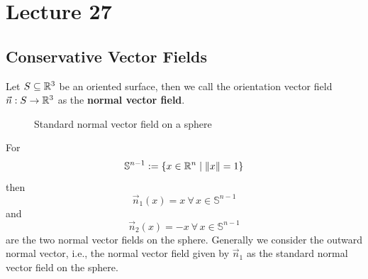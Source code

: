 \documentclass[../Analysis-3.tex]{subfiles}
\begin{document}
\chapter*{Lecture 27} %
\setcounter{chapter}{27} %
\setcounter{section}{0}

\section{Conservative Vector Fields}

Let $S \subseteq \mathbb{R}^3$ be an oriented surface, then we call the orientation vector field $\vec{n} : S \to \mathbb{R}^3$ as the \textbf{normal vector field}.

\begin{Eg}{}{}
  \begin{figure}
    \centering
    \caption{Standard normal vector field on a sphere}\label{fig1:27}
  \end{figure}
  For
  \[
    \mathbb{S}^{n-1} := \{ x \in \mathbb{R}^n \mid \| x \| = 1 \}
  \]
  then
  \[
    \vec{n}_1(x) = x \ \forall \, x \in \mathbb{S}^{n-1}
  \]
  and
  \[
    \vec{n}_2(x) = -x \ \forall \, x \in \mathbb{S}^{n-1}
  \]
  are the two normal vector fields on the sphere. Generally we consider the outward normal vector, i.e., the normal vector field given by $\vec{n}_1$ as the standard normal vector field on the sphere.
\end{Eg}
\end{document}

